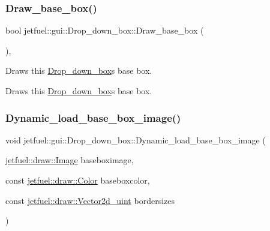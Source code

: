 \subsubsection{\texorpdfstring{Draw\+\_\+base\+\_\+box()}{Draw\_base\_box()}}
{\footnotesize\ttfamily bool jetfuel\+::gui\+::\+Drop\+\_\+down\+\_\+box\+::\+Draw\+\_\+base\+\_\+box (\begin{DoxyParamCaption}{ }\end{DoxyParamCaption})\hspace{0.3cm}{\ttfamily [inline]}, {\ttfamily [protected]}}



Draws this \hyperlink{classjetfuel_1_1gui_1_1Drop__down__box}{Drop\+\_\+down\+\_\+box}\textquotesingle{}s base box. 

Draws this \hyperlink{classjetfuel_1_1gui_1_1Drop__down__box}{Drop\+\_\+down\+\_\+box}\textquotesingle{}s base box. \mbox{\label{classjetfuel_1_1gui_1_1Drop__down__box_a64b807d21f55a85ab9600cfd6369d7dc}} 
\subsubsection{\texorpdfstring{Dynamic\+\_\+load\+\_\+base\+\_\+box\+\_\+image()}{Dynamic\_load\_base\_box\_image()}}
{\footnotesize\ttfamily void jetfuel\+::gui\+::\+Drop\+\_\+down\+\_\+box\+::\+Dynamic\+\_\+load\+\_\+base\+\_\+box\+\_\+image (\begin{DoxyParamCaption}\item[{\hyperlink{classjetfuel_1_1draw_1_1Image}{jetfuel\+::draw\+::\+Image}}]{baseboximage,  }\item[{const \hyperlink{classjetfuel_1_1draw_1_1Color}{jetfuel\+::draw\+::\+Color}}]{baseboxcolor,  }\item[{const \hyperlink{classjetfuel_1_1draw_1_1Vector2d}{jetfuel\+::draw\+::\+Vector2d\+\_\+uint}}]{bordersizes }\end{DoxyParamCaption})\hspace{0.3cm}{\ttfamily [inline]}}



